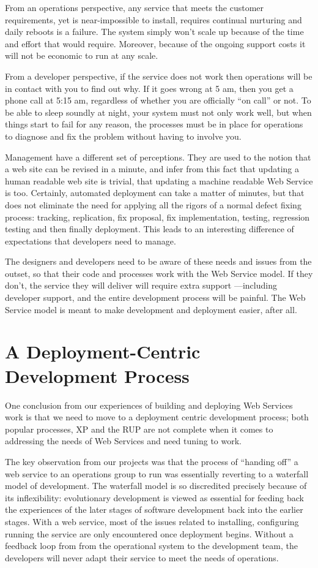 \documentclass[draft]{report}
\begin{document}
From an operations perspective, any service that meets the customer
requirements, yet is near-impossible to install, requires continual
nurturing and daily reboots is a failure. The system simply won't scale
up because of the time and effort that would require. Moreover, because
of the ongoing support costs it will not be economic to run at any
scale.

From a developer perspective, if the service does not work then
operations will be in contact with you to find out why. If it goes wrong
at 5 am, then you get a phone call at 5:15 am, regardless of whether you
are officially ``on call'' or not. To be able to sleep soundly at night,
your system must not only work well, but when things start to fail for
any reason, the processes must be in place for operations to diagnose
and fix the problem without having to involve you.

Management have a different set of perceptions. They are used to the
notion that a web site can be revised in a minute, and infer from this
fact that updating a human readable web site is trivial, that updating a
machine readable Web Service is too. Certainly, automated deployment can
take a matter of minutes, but that does not eliminate the need for
applying all the rigors of a normal defect fixing process: tracking,
replication, fix proposal, fix implementation, testing, regression
testing and then finally deployment. This leads to an interesting
difference of expectations that developers need to manage.

The designers and developers need to be aware of these needs and issues
from the outset, so that their code and processes work with the Web
Service model. If they don't, the service they will deliver will require
extra support ---including developer support, and the entire development
process will be painful. The Web Service model is meant to make
development and deployment easier, after all.

\chapter{A Deployment-Centric Development Process}

One conclusion from our experiences of building and deploying Web
Services work is that we need to move to a deployment centric
development process; both popular processes, XP and the RUP are not
complete when it comes to addressing the needs of Web Services and need
tuning to work.

The key observation from our projects was that the process of ``handing
off'' a web service to an operations group to run was essentially
reverting to a waterfall model of development. The waterfall model is so
discredited precisely because of its inflexibility: evolutionary
development is viewed as essential for feeding back the experiences of
the later stages of software development back into the earlier stages.
With a web service, most of the issues related to installing,
configuring running the service are only encountered once deployment
begins. Without a feedback loop from from the operational system to the
development team, the developers will never adapt their service to meet
the needs of operations.
\end{document}
